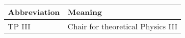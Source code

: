 \noindent\\\\

\begin{tabular}[h]{p{3cm}|l}
	Abbreviation & Meaning\\
	\hline
	TP III & Chair for theoretical Physics III\\
\end{tabular}\\\\

\newpage